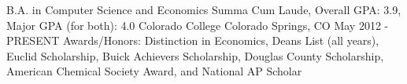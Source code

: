


\begin{cventries}


\cventry
{B.A. in Computer Science and Economics Summa Cum Laude, Overall GPA: 3.9, Major GPA (for both): 4.0} %
{Colorado College} %
{Colorado Springs, CO} %
{May 2012 - PRESENT} %
{Awards/Honors: Distinction in Economics, Deans List (all years), Euclid Scholarship, Buick Achievers Scholarship, Douglas County Scholarship, American Chemical Society Award, and National AP Scholar}


\end{cventries}